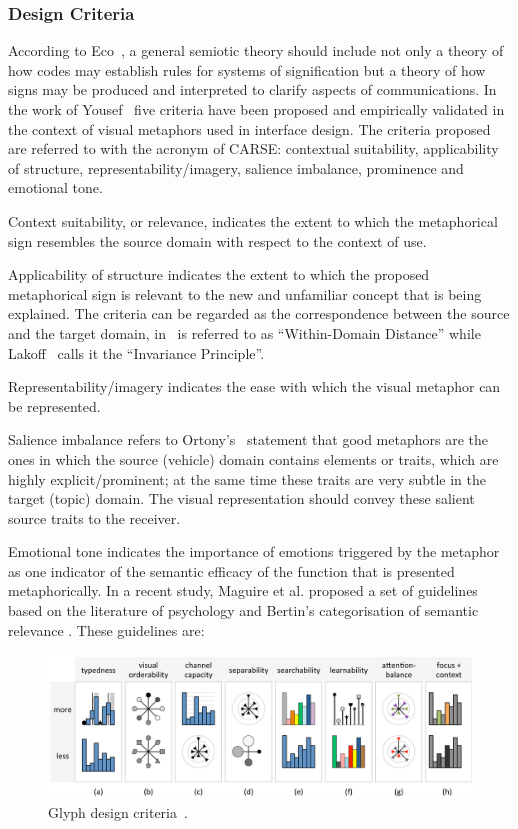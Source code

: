 \subsubsection{Design Criteria}
According to Eco~\cite{Eco1979}, a general semiotic theory should include not only a theory of how codes may establish rules for systems of signification but a 
theory of how signs may be produced and interpreted to clarify aspects of communications.
In the work of Yousef~\cite{Yousef2001} five criteria have been proposed and empirically validated in the context of visual metaphors used in interface design.
The criteria proposed are referred to with the acronym of CARSE: contextual suitability, applicability of structure, representability/imagery, salience imbalance, prominence and emotional tone.

Context suitability, or relevance, indicates the extent to which the metaphorical sign resembles the source domain with respect to the context of use. 

Applicability of structure indicates the extent to which the proposed metaphorical sign is relevant to the new and unfamiliar concept that is being explained. 
The criteria can be regarded as the correspondence between the source and the target domain, in~\cite{Tourangeau1982} is referred to as ``Within-Domain Distance'' while Lakoff~\cite{Lakoff1995} calls it the ``Invariance Principle''. 

Representability/imagery indicates the ease with which the visual metaphor can be represented.

Salience imbalance refers to Ortony's~\cite{Ortony1993} statement that good metaphors are
the ones in which the source (vehicle) domain contains elements
or traits, which are highly explicit/prominent; at the same time
these traits are very subtle in the target (topic) domain. The visual representation should convey 
these salient source traits to the receiver. 

Emotional tone indicates the importance of emotions triggered by the
metaphor as one indicator of the semantic efficacy of the
function that is presented metaphorically.
In a recent study, Maguire et al. proposed a set of guidelines based on the literature of psychology and Bertin's categorisation of semantic relevance \cite{Maguire:2012:TVCG}.  These guidelines are:

\begin{figure}[t]
\includegraphics[width = \textwidth]{images/related-work-glyphs/designprinciples_ver2.png}
\caption{Glyph design criteria~\cite{chung13glyphSorting}.\label{fig:glyphSorting}}
\end{figure}

